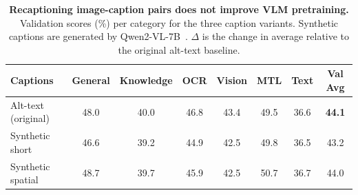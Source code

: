 \begin{table}[t]
    \centering
    \caption{\textbf{Recaptioning image-caption pairs does not improve VLM pretraining.} Validation scores (\%) per category for the three caption variants. Synthetic captions are generated by Qwen2-VL-7B~\citep{wang2024qwen2}. $\Delta$ is the change in average relative to the original alt-text baseline.}
    \label{tab:recaptioning-val}
    \small
    \begin{tabular}{lccccccc}
        \toprule
        \textbf{Captions} & \textbf{General} & \textbf{Knowledge} & \textbf{OCR} & \textbf{Vision} & \textbf{MTL} & \textbf{Text} & \textbf{Val Avg} \\
        \midrule
        Alt-text (original) & 48.0 & 40.0 & 46.8 & 43.4 & 49.5 & 36.6 & \textbf{44.1} \\
        Synthetic short     & 46.6 & 39.2 & 44.9 & 42.5 & 49.8 & 36.5 & 43.2 \\
        Synthetic spatial   & 48.7 & 39.7 & 45.9 & 42.5 & 50.7 & 36.7 & 44.0 \\
        \bottomrule
    \end{tabular}
\end{table}
